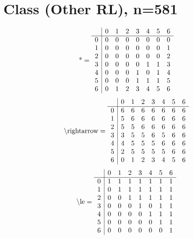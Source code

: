 \documentclass[11pt]{article}
\begin{document}
\section{Class (Other RL), n=581}
\[\text{*} = 
\begin{array}{r | r r r r r r r}
 & 0 & 1 & 2 & 3 & 4 & 5 & 6 \\ \hline
0 & 0 & 0 & 0 & 0 & 0 & 0 & 0 \\
1 & 0 & 0 & 0 & 0 & 0 & 0 & 1 \\
2 & 0 & 0 & 0 & 0 & 0 & 0 & 2 \\
3 & 0 & 0 & 0 & 0 & 1 & 1 & 3 \\
4 & 0 & 0 & 0 & 1 & 0 & 1 & 4 \\
5 & 0 & 0 & 0 & 1 & 1 & 1 & 5 \\
6 & 0 & 1 & 2 & 3 & 4 & 5 & 6 \\
\end{array}
\]
\[\text{\textbackslash rightarrow} = 
\begin{array}{r | r r r r r r r}
 & 0 & 1 & 2 & 3 & 4 & 5 & 6 \\ \hline
0 & 6 & 6 & 6 & 6 & 6 & 6 & 6 \\
1 & 5 & 6 & 6 & 6 & 6 & 6 & 6 \\
2 & 5 & 5 & 6 & 6 & 6 & 6 & 6 \\
3 & 3 & 5 & 5 & 6 & 5 & 6 & 6 \\
4 & 4 & 5 & 5 & 5 & 6 & 6 & 6 \\
5 & 2 & 5 & 5 & 5 & 5 & 6 & 6 \\
6 & 0 & 1 & 2 & 3 & 4 & 5 & 6 \\
\end{array}
\]
\[\text{\textbackslash le} = 
\begin{array}{r | r r r r r r r}
 & 0 & 1 & 2 & 3 & 4 & 5 & 6 \\ \hline
0 & 1 & 1 & 1 & 1 & 1 & 1 & 1 \\
1 & 0 & 1 & 1 & 1 & 1 & 1 & 1 \\
2 & 0 & 0 & 1 & 1 & 1 & 1 & 1 \\
3 & 0 & 0 & 0 & 1 & 0 & 1 & 1 \\
4 & 0 & 0 & 0 & 0 & 1 & 1 & 1 \\
5 & 0 & 0 & 0 & 0 & 0 & 1 & 1 \\
6 & 0 & 0 & 0 & 0 & 0 & 0 & 1 \\
\end{array}
\]
\end{document}
